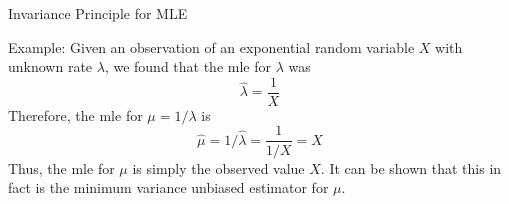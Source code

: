 \documentclass[t,handout]{beamer}
\begin{document}
        \begin{frame}{Invariance Principle for MLE}
            
            \pause Example: Given an observation of an exponential random variable $X$ with unknown rate $\lambda$, we found that the mle for $\lambda$ was $$\hat\lambda = \frac1X$$
            Therefore, the mle for $\mu=1/\lambda$ is $$\hat\mu = 1/\hat\lambda = \frac1{1/X}=X$$
            Thus, the mle for $\mu$ is simply the observed value $X$. It can be shown that this in fact is the minimum variance unbiased estimator for $\mu$.
            \end{frame}
\end{document}
